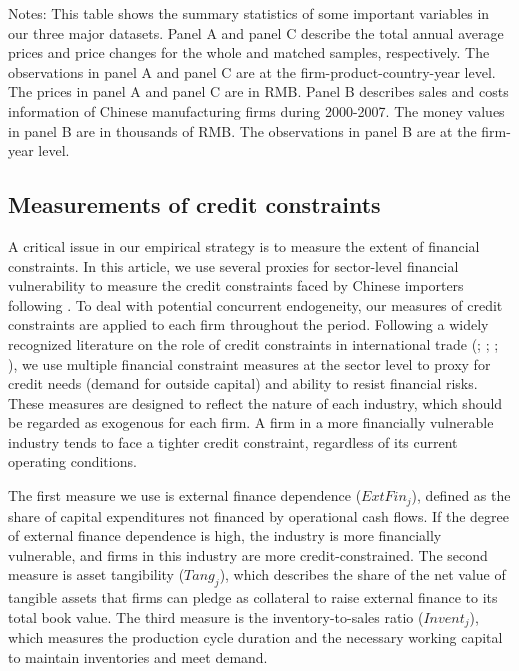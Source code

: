\begin{table}[H]
{\begin{threeparttable}
	\begin{tablenotes}
		\footnotesize
		\item Notes: This table shows the summary statistics of some important variables in our three major datasets. Panel A and panel C describe the total annual average prices and price changes for the whole and matched samples, respectively. The observations in panel A and panel C are at the firm-product-country-year level. The prices in panel A and panel C are in RMB. Panel B describes sales and costs information of Chinese manufacturing firms during 2000-2007. The money values in panel B are in thousands of RMB. The observations in panel B are at the firm-year level.
	\end{tablenotes}
	\end{threeparttable}
        }
\end{table}

\subsection{Measurements of credit constraints} \label{Measurements-Credit Constraints}

A critical issue in our empirical strategy is to measure the extent of financial constraints. In this article, we use several proxies for sector-level financial vulnerability to measure the credit constraints faced by Chinese importers following \cite{manova2013}. To deal with potential concurrent endogeneity, our measures of credit constraints are applied to each firm throughout the period. Following a widely recognized literature on the role of credit constraints in international trade (\cite{kroszner2007}; \cite{manova2013}; \cite{manova-wei-zhang2015}; \cite{fan-lai-li2015}), we use multiple financial constraint measures at the sector level to proxy for credit needs (demand for outside capital) and ability to resist financial risks. These measures are designed to reflect the nature of each industry, which should be regarded as exogenous for each firm. A firm in a more financially vulnerable industry tends to face a tighter credit constraint, regardless of its current operating conditions.

The first measure we use is external finance dependence ($ExtFin_j$), defined as the share of capital expenditures not financed by operational cash flows. If the degree of external finance dependence is high, the industry is more financially vulnerable, and firms in this industry are more credit-constrained. The second measure is asset tangibility ($Tang_j$), which describes the share of the net value of tangible assets that firms can pledge as collateral to raise external finance to its total book value. The third measure is the inventory-to-sales ratio ($Invent_j$), which measures the production cycle duration and the necessary working capital to maintain inventories and meet demand. 

